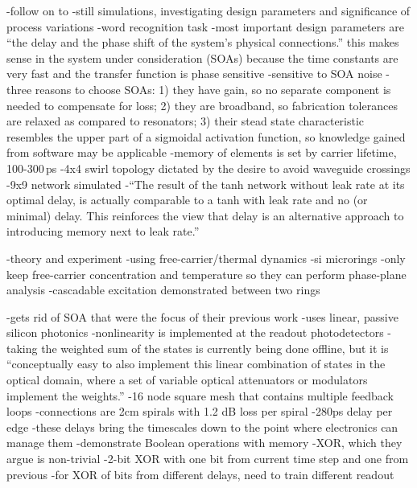\cite{vada2011}
-follow on to \cite{vadi2008}
-still simulations, investigating design parameters and significance of process variations
-word recognition task
-most important design parameters are ``the delay and the phase shift of the system's physical connections.'' this makes sense in the system under consideration (SOAs) because the time constants are very fast and the transfer function is phase sensitive
-sensitive to SOA noise
-three reasons to choose SOAs: 1) they have gain, so no separate component is needed to compensate for loss; 2) they are broadband, so fabrication tolerances are relaxed as compared to resonators; 3) their stead state characteristic resembles the upper part of a sigmoidal activation function, so knowledge gained from software may be applicable
-memory of elements is set by carrier lifetime, 100-300\,ps
-4x4 swirl topology dictated by the desire to avoid waveguide crossings
-9x9 network simulated
-``The result of the tanh network without leak rate at its optimal delay, is actually comparable to a tanh with leak rate and no (or minimal) delay. This reinforces the view that delay is an alternative approach to introducing memory next to leak rate.''

\cite{vafi2012}
-theory and experiment
-using free-carrier/thermal dynamics
-si microrings
-only keep free-carrier concentration and temperature so they can perform phase-plane analysis
-cascadable excitation demonstrated between two rings

\cite{vame2014}
-gets rid of SOA that were the focus of their previous work
-uses linear, passive silicon photonics
-nonlinearity is implemented at the readout photodetectors
-taking the weighted sum of the states is currently being done offline, but it is ``conceptually easy to also implement this linear combination of states in the optical domain, where a set of variable optical attenuators or modulators implement the weights.''
-16 node square mesh that contains multiple feedback loops
-connections are 2cm spirals with 1.2 dB loss per spiral
-280ps delay per edge
-these delays bring the timescales down to the point where electronics can manage them
-demonstrate Boolean operations with memory
-XOR, which they argue is non-trivial
-2-bit XOR with one bit from current time step and one from previous
-for XOR of bits from different delays, need to train different readout

